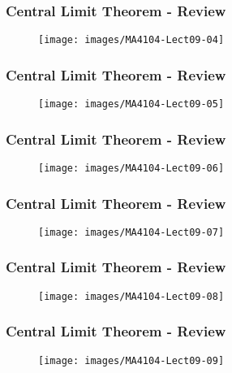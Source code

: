 \documentclass{beamer}
\begin{document}
		\begin{frame}
			\frametitle{Central Limit Theorem - Review}
			\begin{figure}
				\centering
				\texttt{[image: images/MA4104-Lect09-04]}
				
			\end{figure}
		\end{frame}
		\begin{frame}
			\frametitle{Central Limit Theorem - Review}
			\begin{figure}
				\centering	
				\texttt{[image: images/MA4104-Lect09-05]}
				
			\end{figure}
		\end{frame}
		\begin{frame}
			\frametitle{Central Limit Theorem - Review}
			\begin{figure}
				\centering
				\texttt{[image: images/MA4104-Lect09-06]}
				
			\end{figure}
		\end{frame}
		\begin{frame}
			\frametitle{Central Limit Theorem - Review}
			\begin{figure}
				\centering	
				\texttt{[image: images/MA4104-Lect09-07]}
				
			\end{figure}
		\end{frame}
		\begin{frame}
			\frametitle{Central Limit Theorem - Review}
			\begin{figure}
				\centering
				\texttt{[image: images/MA4104-Lect09-08]}
				
			\end{figure}
		\end{frame}
		\begin{frame}
			\frametitle{Central Limit Theorem - Review}
			\begin{figure}
				\centering	
				\texttt{[image: images/MA4104-Lect09-09]}
				
			\end{figure}
		\end{frame}
	
\end{document}
